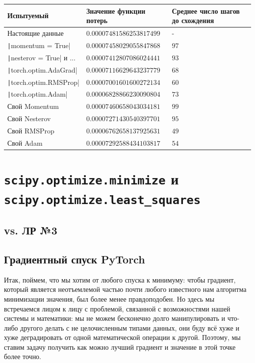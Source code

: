 \documentclass[12pt, a4paper, oneside, final]{article}
\begin{document}
	\begin{table}[H]
		\centering
		\begin{tabular}{l|l|l}
			Испытуемый & Значение функции потерь & Среднее число шагов до схождения \\ \hline
			Настоящие данные & $0.00007481586253817499$ & - \\
			\texttt|momentum = True| & $0.00007458029055847868$ & $97$ \\
			\texttt|nesterov = True| и ... & $0.00007412807086024441$ & $93$ \\
			\texttt|torch.optim.AdaGrad| & $0.00007116629643237779$ & $68$ \\
			\texttt|torch.optim.RMSProp| & $0.00007001601600272134$ & $60$ \\
			\texttt|torch.optim.Adam| & $0.00006828866230090804$ & $73$ \\
			Свой Momentum & $0.00007460658043034181$ & $99$ \\
			Свой Nesterov & $0.00007271430540397701$ & $95$ \\
			Свой RMSProp & $0.00006762658137925631$ & $49$ \\
			Свой Adam & $0.00007292588434103817$ & $54$
		\end{tabular}
	\end{table}
	\newpage
	\section*{\texttt{scipy.optimize.minimize} и \texttt{scipy.optimize.least\_squares}}
	\subsection*{vs. ЛР №3}
	\subsection*{Градиентный спуск PyTorch}
	Итак, поймем, что мы хотим от любого спуска к минимуму: чтобы градиент, который является неотъемлемой частью почти любого известного нам алгоритма минимизации значения, был более менее правдоподобен.
	Но здесь мы встречаемся лицом к лицу с проблемой, связанной с возможностями нашей системы и математики: мы не можем бесконечно долго манипулировать и что-либо другого делать с не целочисленным типами данных, они буду всё хуже и хуже деградировать от одной математической операции к другой.
	Поэтому, мы ставим задачу получить как можно лучший градиент и значение в этой точке более точно.
\end{document}
